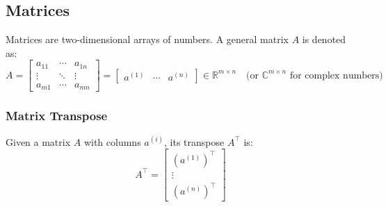 \subsection{Matrices}
\begin{definition}
    Matrices are two-dimensional arrays of numbers. A general matrix \( A \) is denoted as:
    \begin{equation}
        A = \begin{bmatrix}
            a_{11} & \cdots & a_{1n} \\
            \vdots & \ddots & \vdots \\
            a_{m1} & \cdots & a_{mn}
            \end{bmatrix} 
            = \begin{bmatrix}
                a^{(1)} & \cdots & a^{(n)}
                \end{bmatrix}
            \in \mathbb{R}^{m \times n} \quad \text{(or $\mathbb{C}^{m \times n}$ for complex numbers)}
    \end{equation}
\end{definition}

    \subsubsection{Matrix Transpose}
    \begin{definition}
        Given a matrix \( A \) with columns \( a^{(i)} \), its transpose \( A^\top \) is:
        \begin{equation}
            A^\top = \begin{bmatrix}
                (a^{(1)})^\top \\
                \vdots \\
                (a^{(n)})^\top
                \end{bmatrix}
        \end{equation}
    \end{definition}

